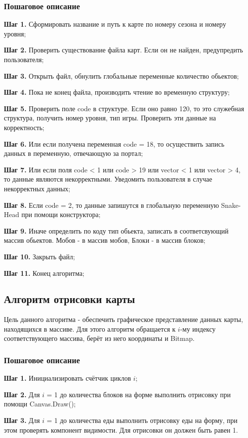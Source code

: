 \documentclass[a4paper,14pt]{extarticle}
\begin{document}
\subsubsection{Пошаговое описание}
\textbf{Шаг 1.} Сформировать название и путь к карте по номеру сезона и номеру уровня;

\textbf{Шаг 2.} Проверить существование файла карт. Если он не найден, предупредить пользователя;

\textbf{Шаг 3.} Открыть файл, обнулить глобальные переменные количество обьектов;

\textbf{Шаг 4.} Пока не конец файла, производить чтение во временную структуру;

\textbf{Шаг 5.} Проверить поле code в структуре. Если оно равно 120, то это служебная структура, получить номер уровня, тип игры. Проверить эти данные на корректность;

\textbf{Шаг 6.} Или если получена переменная code = 18, то осуществить запись данных в переменную, отвечающую за портал;

\textbf{Шаг 7.} Или если поля code < 1 или code > 19 или vector < 1 или vector > 4, то данные являются некорректными. Уведомить пользователя в случае некорректных данных;

\textbf{Шаг 8.} Если code = 2, то данные запишутся в глобальную переменную Snake-Head при помощи конструктора;

\textbf{Шаг 9.} Иначе определить по коду тип обьекта, записать в соответсвующий массив обьектов. Мобов - в массив мобов, Блоки - в массив блоков; 

\textbf{Шаг 10.} Закрыть файл;

\textbf{Шаг 11.} Конец алгоритма;
\subsection{Алгоритм отрисовки карты}
Цель данного алгоритма - обеспечить графическое представление данных карты, находящихся в массиве. Для этого алгоритм обращается к $i$-му индексу соответствующего массива, берёт из него координаты и Bitmap.
\subsubsection{Пошаговое описание}
\textbf{Шаг 1.} Инициализировать счётчик циклов $i$;

\textbf{Шаг 2.} Для $i$ = 1 до количества блоков на форме выполнить отрисовку при помощи Canvas.Draw();

\textbf{Шаг 3.} Для $i$ = 1 до количества еды выполнить отрисовку еды на форму, при этом проверять компонент видимости. Для отрисовки он должен быть равен 1.
\end{document}
